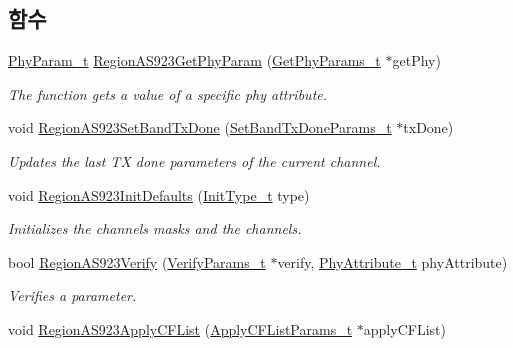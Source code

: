 \subsection*{함수}
\begin{DoxyCompactItemize}
\item 
\mbox{\hyperlink{group___r_e_g_i_o_n_gaed159b26e5c4677236b6e8677019db30}{Phy\+Param\+\_\+t}} \mbox{\hyperlink{group___r_e_g_i_o_n_a_s923_ga20508dee35c0f25ff507478c5235fdeb}{Region\+A\+S923\+Get\+Phy\+Param}} (\mbox{\hyperlink{group___r_e_g_i_o_n_gab471483fff904f4f89bbc03f7fc380ab}{Get\+Phy\+Params\+\_\+t}} $\ast$get\+Phy)
\begin{DoxyCompactList}\small\item\em The function gets a value of a specific phy attribute. \end{DoxyCompactList}\item 
void \mbox{\hyperlink{group___r_e_g_i_o_n_a_s923_ga8e986a04899f4346d7005b5ab3722298}{Region\+A\+S923\+Set\+Band\+Tx\+Done}} (\mbox{\hyperlink{group___r_e_g_i_o_n_gad0524aa0673c0814a71e7a4f9cade3fc}{Set\+Band\+Tx\+Done\+Params\+\_\+t}} $\ast$tx\+Done)
\begin{DoxyCompactList}\small\item\em Updates the last TX done parameters of the current channel. \end{DoxyCompactList}\item 
void \mbox{\hyperlink{group___r_e_g_i_o_n_a_s923_ga24e0f9bd2b50e0a8efb5e3d5ecc12904}{Region\+A\+S923\+Init\+Defaults}} (\mbox{\hyperlink{group___r_e_g_i_o_n_gaddc73ae10673ec925724e7870363bda9}{Init\+Type\+\_\+t}} type)
\begin{DoxyCompactList}\small\item\em Initializes the channels masks and the channels. \end{DoxyCompactList}\item 
bool \mbox{\hyperlink{group___r_e_g_i_o_n_a_s923_ga6287722023036c70f4a9b1ec43901be5}{Region\+A\+S923\+Verify}} (\mbox{\hyperlink{group___r_e_g_i_o_n_ga966d97bc2f25df1c09e92e60ef652276}{Verify\+Params\+\_\+t}} $\ast$verify, \mbox{\hyperlink{group___r_e_g_i_o_n_ga9445b07fdf77581ecfaf389970e635f8}{Phy\+Attribute\+\_\+t}} phy\+Attribute)
\begin{DoxyCompactList}\small\item\em Verifies a parameter. \end{DoxyCompactList}\item 
void \mbox{\hyperlink{group___r_e_g_i_o_n_a_s923_ga06106e86f717362c50165a5adaf73331}{Region\+A\+S923\+Apply\+C\+F\+List}} (\mbox{\hyperlink{group___r_e_g_i_o_n_ga71588e9ad07e34b78fa91d51881fd3c6}{Apply\+C\+F\+List\+Params\+\_\+t}} $\ast$apply\+C\+F\+List)

\end{DoxyCompactItemize}
